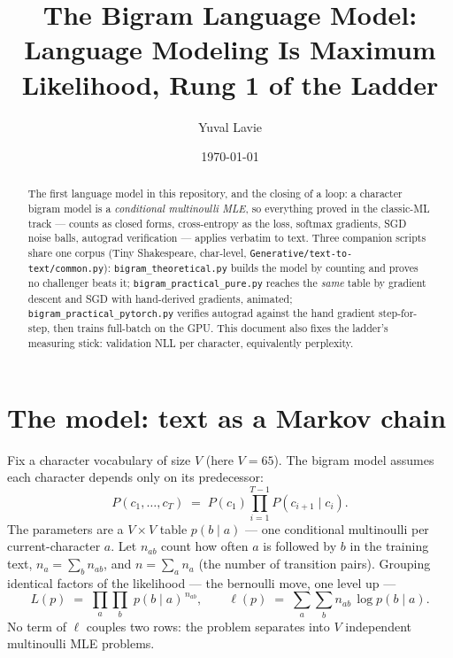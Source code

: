 \documentclass[11pt]{article}
\title{The Bigram Language Model:\\
Language Modeling Is Maximum Likelihood, Rung 1 of the Ladder}
\author{Yuval Lavie}
\date{\today}
\begin{document}
\maketitle

\begin{abstract}
The first language model in this repository, and the closing of a loop:
a character bigram model is a \emph{conditional multinoulli MLE}, so
everything proved in the classic-ML track --- counts as closed forms,
cross-entropy as the loss, softmax gradients, SGD noise balls, autograd
verification --- applies verbatim to text. Three companion scripts share
one corpus (Tiny Shakespeare, char-level, \texttt{Generative/text-to-text/common.py}):
\texttt{bigram\_theoretical.py} builds the model by counting and proves
no challenger beats it; \texttt{bigram\_practical\_pure.py} reaches the
\emph{same} table by gradient descent and SGD with hand-derived
gradients, animated; \texttt{bigram\_practical\_pytorch.py} verifies
autograd against the hand gradient step-for-step, then trains
full-batch on the GPU. This document also fixes the ladder's measuring
stick: validation NLL per character, equivalently perplexity.
\end{abstract}

\section{The model: text as a Markov chain}

Fix a character vocabulary of size $V$ (here $V = 65$). The bigram
model assumes each character depends only on its predecessor:
\begin{equation}
  P(c_1, \dots, c_T)
  \;=\; P(c_1) \prod_{i=1}^{T-1} P(c_{i+1} \mid c_i).
  \label{eq:markov}
\end{equation}
The parameters are a $V \times V$ table $p(b \mid a)$ --- one
conditional multinoulli per current-character $a$. Let
$n_{ab}$ count how often $a$ is followed by $b$ in the training text,
$n_a = \sum_b n_{ab}$, and $n = \sum_a n_a$ (the number of transition
pairs). Grouping identical factors of the likelihood --- the bernoulli
move, one level up ---
\begin{equation}
  L(p) \;=\; \prod_{a}\prod_{b}\; p(b \mid a)^{\,n_{ab}},
  \qquad
  \ell(p) \;=\; \sum_{a}\sum_{b} n_{ab}\,\log p(b \mid a).
  \label{eq:loglik}
\end{equation}
No term of $\ell$ couples two rows: the problem separates into $V$
independent multinoulli MLE problems.
\end{document}
